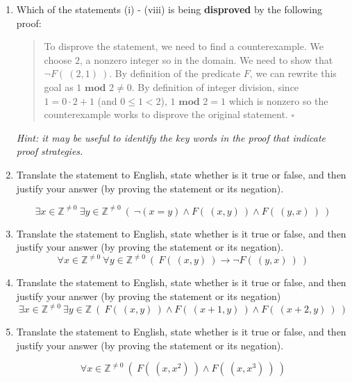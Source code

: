 \documentclass[12pt, oneside]{article}
\begin{document}
\begin{enumerate}[labelindent=0pt, leftmargin=0pt]
\begin{enumerate}
    \item
    Which of the statements (i) - (viii) is being {\bf disproved} by the following proof:
    
    \begin{quote}
      To disprove the statement, we need to find a counterexample. We choose $2$, a nonzero
      integer so in the domain. We need to show that $\lnot F(~(2,1)~)$. By definition of the predicate $F$, we 
      can rewrite this goal as $1 \textbf{ mod } 2 \neq 0$. By definition of integer division, since 
      $1 = 0 \cdot 2  + 1$ (and $0 \leq 1 < 2$), $1 \textbf { mod } 2 = 1$ which is nonzero so the counterexample works to 
      disprove the original statement.
       $\square$
    \end{quote}
    
    {\it Hint: it may be useful to 
    identify the key words in the proof that indicate proof strategies.}
    
    \item 
    Translate the statement to English, state whether is it true or false, and then justify your answer (by proving the statement or its negation).

    $$\exists x \in \mathbb{Z}^{\neq 0}~ \exists y \in \mathbb{Z}^{\neq 0} ~(~\lnot(x = y) \land F(~(x,y)~) \land F(~(y,x)~)~)$$
    
    \item 
    Translate the statement to English, state whether is it true or false, and then justify your answer (by proving the statement or its negation).
    $$\forall x \in \mathbb{Z}^{\neq 0}~ \forall y \in \mathbb{Z}^{\neq 0} ~(~F(~(x,y)~) \to \lnot F(~(y,x)~)~)$$
    
    \item 
    Translate the statement to English, state whether is it true or false, and then justify your answer (by proving the statement or its negation)
    $$\exists x \in \mathbb{Z}^{\neq 0}~ \exists y \in \mathbb{Z}~(~F(~(x,y)~) \land  F(~(x+1, y)~) \land F(~(x+2, y)~)~)$$
    
    \item 
    Translate the statement to English, state whether is it true or false, and then justify your answer (by proving the statement or its negation).
 
    $$\forall x \in \mathbb{Z}^{\neq 0}~ (~F(~(x,x^2)~) \land F(~(x,x^3)~)~)$$
    
    \end{enumerate}
    

\end{enumerate}
\end{document}
